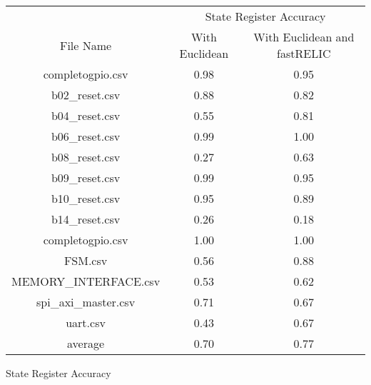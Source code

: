 \bigskip\begin{tabular}{|c|c|c|}
    \hline
     & \multicolumn{2}{c|}{State Register Accuracy}\\
    \cline {2-3}
    File Name & With Euclidean & With Euclidean and fastRELIC \\
    \hline
    \hline
    completogpio.csv & 0.98 & 0.95\\
    \hline
    b02\_reset.csv & 0.88 & 0.82\\
    \hline
    b04\_reset.csv & 0.55 & 0.81\\
    \hline
    b06\_reset.csv & 0.99 & 1.00\\
    \hline
    b08\_reset.csv & 0.27 & 0.63\\
    \hline
    b09\_reset.csv & 0.99 & 0.95\\
    \hline
    b10\_reset.csv & 0.95 & 0.89\\
    \hline
    b14\_reset.csv & 0.26 & 0.18\\
    \hline
    completogpio.csv & 1.00 & 1.00\\
    \hline
    FSM.csv & 0.56 & 0.88\\
    \hline
    MEMORY\_INTERFACE.csv & 0.53 & 0.62\\
    \hline
    spi\_axi\_master.csv & 0.71 & 0.67\\
    \hline
    uart.csv & 0.43 & 0.67\\
    \hline
    \hline
    average & 0.70 & 0.77\\
    \hline
\end{tabular}
\caption{State Register Accuracy}
\label{tab:State Register Accuracy Feature Redundant}